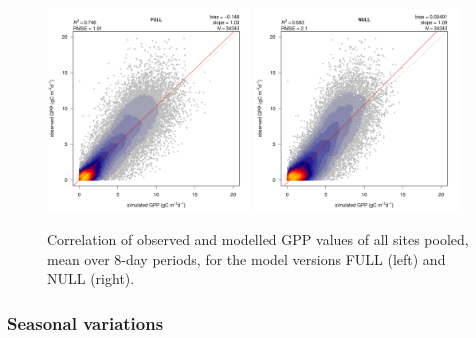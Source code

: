 \documentclass{myreport}
\begin{document}
\begin{figure}[!ht]
    \includegraphics[width=0.48\textwidth]{fig/modobs_xdaily_FULL.pdf}
    \includegraphics[width=0.48\textwidth]{fig/modobs_xdaily_NULL.pdf}
    \caption{Correlation of observed and modelled GPP values of all sites pooled, mean over 8-day periods, for the model versions FULL (left) and NULL (right).}
    \label{fig:modobs_xdaily}
\end{figure}

\subsubsection{Seasonal variations}
\end{document}
